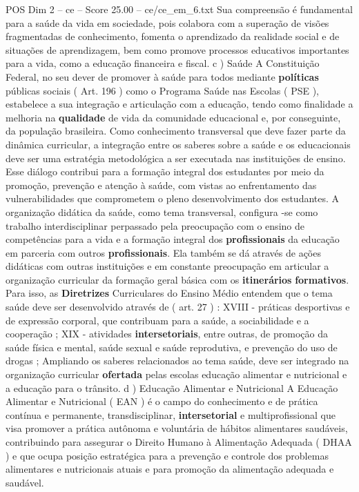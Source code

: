 \begin{textsample}{POS Dim 2 – ce – Score 25.00 – ce/ce\_em\_6.txt}
Sua compreensão é fundamental para a saúde da vida em sociedade, pois colabora com a superação de visões fragmentadas de conhecimento, fomenta o aprendizado da realidade social e de situações de aprendizagem, bem como promove processos educativos importantes para a vida, como a educação financeira e fiscal. c ) Saúde A Constituição Federal, no seu dever de promover à saúde para todos mediante \textbf{políticas} públicas sociais ( Art. 196 ) como o Programa Saúde nas Escolas ( PSE ), estabelece a sua integração e articulação com a educação, tendo como finalidade a melhoria na \textbf{qualidade} de vida da comunidade educacional e, por conseguinte, da população brasileira.
Como conhecimento transversal que deve fazer parte da dinâmica curricular, a integração entre os saberes sobre a saúde e os educacionais deve ser uma estratégia metodológica a ser executada nas instituições de ensino.
Esse diálogo contribui para a formação integral dos estudantes por meio da promoção, prevenção e atenção à saúde, com vistas ao enfrentamento das vulnerabilidades que comprometem o pleno desenvolvimento dos estudantes.
A organização didática da saúde, como tema transversal, configura -se como trabalho interdisciplinar perpassado pela preocupação com o ensino de competências para a vida e a formação integral dos \textbf{profissionais} da educação em parceria com outros \textbf{profissionais}.
Ela também se dá através de ações didáticas com outras instituições e em constante preocupação em articular a organização curricular da formação geral básica com os \textbf{itinerários} \textbf{formativos}.
Para isso, as \textbf{Diretrizes} Curriculares do Ensino Médio entendem que o tema saúde deve ser desenvolvido através de ( art. 27 ) : XVIII - práticas desportivas e de expressão corporal, que contribuam para a saúde, a sociabilidade e a cooperação ; XIX - atividades \textbf{intersetoriais}, entre outras, de promoção da saúde física e mental, saúde sexual e saúde reprodutiva, e prevenção do uso de drogas ; Ampliando os saberes relacionados ao tema saúde, deve ser integrado na organização curricular \textbf{ofertada} pelas escolas educação alimentar e nutricional e a educação para o trânsito. d ) Educação Alimentar e Nutricional A Educação Alimentar e Nutricional ( EAN ) é o campo do conhecimento e de prática contínua e permanente, transdisciplinar, \textbf{intersetorial} e multiprofissional que visa promover a prática autônoma e voluntária de hábitos alimentares saudáveis, contribuindo para assegurar o Direito Humano à Alimentação Adequada ( DHAA ) e que ocupa posição estratégica para a prevenção e controle dos problemas alimentares e nutricionais atuais e para promoção da alimentação adequada e saudável.

\end{textsample}
